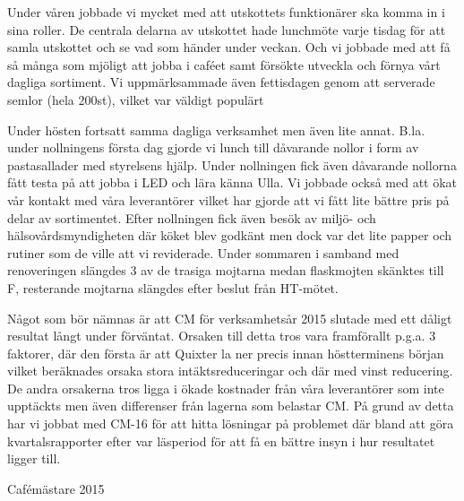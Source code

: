 \documentclass[../_main/handlingar.tex]{subfiles}
\begin{document}

Under våren jobbade vi mycket med att utskottets funktionärer ska komma in i sina roller. De centrala delarna av utskottet hade lunchmöte varje tisdag för att samla utskottet och se vad som händer under veckan. Och vi jobbade med att få så många som mjöligt att jobba i caféet samt försökte utveckla och förnya vårt dagliga sortiment. Vi uppmärksammade även fettisdagen genom att serverade semlor (hela 200st), vilket var väldigt populärt

Under hösten fortsatt samma dagliga verksamhet men även lite annat. B.la. under nollningens första dag gjorde vi lunch till dåvarande nollor i form av pastasallader med styrelsens hjälp. Under nollningen fick även dåvarande nollorna fått testa på att jobba i LED och lära känna Ulla. Vi jobbade också med att ökat vår kontakt med våra leverantörer vilket har gjorde att vi fått lite bättre pris på delar av sortimentet. Efter nollningen fick även besök av miljö- och hälsovårdsmyndigheten där köket blev godkänt men dock var det lite papper och rutiner som de ville att vi reviderade. Under sommaren i samband med renoveringen slängdes 3 av de trasiga mojtarna medan flaskmojten skänktes till F, resterande mojtarna slängdes efter beslut från HT-mötet.

Något som bör nämnas är att CM för verksamhetsår 2015 slutade med ett dåligt resultat långt under förväntat. Orsaken till detta tros vara framförallt p.g.a. 3 faktorer, där den första är att Quixter la ner precis innan höstterminens början vilket beräknades orsaka stora intäktsreduceringar och där med vinst reducering. De andra orsakerna tros ligga i ökade kostnader från våra leverantörer som inte upptäckts men även differenser från lagerna som belastar CM. På grund av detta har vi jobbat med CM-16 för att hitta lösningar på problemet där bland att göra kvartalsrapporter efter var läsperiod för att få en bättre insyn i hur resultatet ligger till.

\begin{signatures}{1}
    \mvh
    \signature{Anders Nilsson}{Cafémästare 2015}
\end{signatures}
\end{document}
